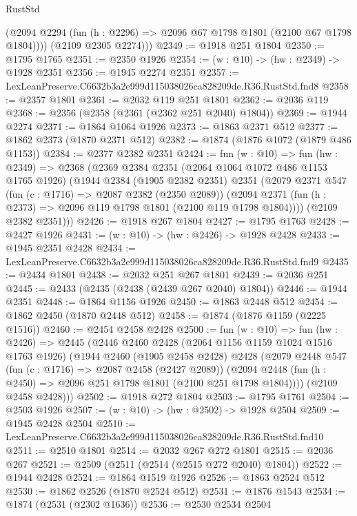 \begin{lexlean}{RustStd}
\begin{coremodule}
          (@2094 @2294 (fun (h : @2296) => @2096 @67 @1798 @1801 (@2100 @67 @1798 @1804))))
        (@2109 @2305 @2274)))
@2349 := @1918 @251 @1804
@2350 := @1795 @1765
@2351 := @2350 @1926
@2354 := (w : @10) -> (hw : @2349) -> @1928 @2351
@2356 := @1945 @2274 @2351
@2357 := LexLeanPreserve.C6632b3a2e999d115038026ca828209de.R36.RustStd.fnd8
@2358 := @2357 @1801
@2361 := @2032 @119 @251 @1801
@2362 := @2036 @119
@2368 := @2356 (@2358 (@2361 (@2362 @251 @2040) @1804))
@2369 := @1944 @2274
@2371 := @1864 @1064 @1926
@2373 := @1863 @2371 @512
@2377 := @1862 @2373 (@1870 @2371 @512)
@2382 := @1874 (@1876 @1072 (@1879 @486 @1153))
@2384 := @2377 @2382 @2351
@2424 := fun (w : @10) =>
  fun (hw : @2349) =>
  @2368
    (@2369
      @2384
      @2351
      (@2064 @1064 @1072 @486 @1153 @1765 @1926)
      (@1944
        @2384
        (@1905 @2382 @2351)
        @2351
        (@2079
          @2371
          @547
          (fun (c : @1716) => @2087 @2382 (@2350 @2089))
          (@2094 @2371 (fun (h : @2373) => @2096 @119 @1798 @1801 (@2100 @119 @1798 @1804))))
        (@2109 @2382 @2351)))
@2426 := @1918 @267 @1804
@2427 := @1795 @1763
@2428 := @2427 @1926
@2431 := (w : @10) -> (hw : @2426) -> @1928 @2428
@2433 := @1945 @2351 @2428
@2434 := LexLeanPreserve.C6632b3a2e999d115038026ca828209de.R36.RustStd.fnd9
@2435 := @2434 @1801
@2438 := @2032 @251 @267 @1801
@2439 := @2036 @251
@2445 := @2433 (@2435 (@2438 (@2439 @267 @2040) @1804))
@2446 := @1944 @2351
@2448 := @1864 @1156 @1926
@2450 := @1863 @2448 @512
@2454 := @1862 @2450 (@1870 @2448 @512)
@2458 := @1874 (@1876 @1159 (@2225 @1516))
@2460 := @2454 @2458 @2428
@2500 := fun (w : @10) =>
  fun (hw : @2426) =>
  @2445
    (@2446
      @2460
      @2428
      (@2064 @1156 @1159 @1024 @1516 @1763 @1926)
      (@1944
        @2460
        (@1905 @2458 @2428)
        @2428
        (@2079
          @2448
          @547
          (fun (c : @1716) => @2087 @2458 (@2427 @2089))
          (@2094 @2448 (fun (h : @2450) => @2096 @251 @1798 @1801 (@2100 @251 @1798 @1804))))
        (@2109 @2458 @2428)))
@2502 := @1918 @272 @1804
@2503 := @1795 @1761
@2504 := @2503 @1926
@2507 := (w : @10) -> (hw : @2502) -> @1928 @2504
@2509 := @1945 @2428 @2504
@2510 := LexLeanPreserve.C6632b3a2e999d115038026ca828209de.R36.RustStd.fnd10
@2511 := @2510 @1801
@2514 := @2032 @267 @272 @1801
@2515 := @2036 @267
@2521 := @2509 (@2511 (@2514 (@2515 @272 @2040) @1804))
@2522 := @1944 @2428
@2524 := @1864 @1519 @1926
@2526 := @1863 @2524 @512
@2530 := @1862 @2526 (@1870 @2524 @512)
@2531 := @1876 @1543
@2534 := @1874 (@2531 (@2302 @1636))
@2536 := @2530 @2534 @2504

\end{coremodule}
\end{lexlean}
